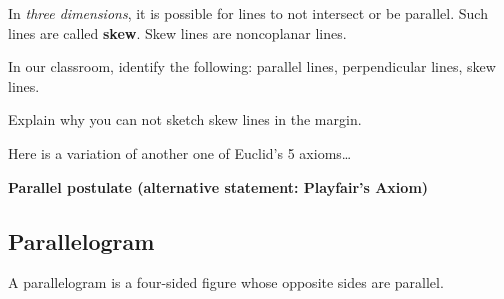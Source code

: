 	\begin{center}	
	\end{center}

In \emph{three dimensions}, it is possible for lines to not intersect or be parallel. 
Such lines are called \textbf{skew}. 
Skew lines are noncoplanar lines.

\q In our classroom, identify the following: parallel lines, perpendicular lines, skew lines.
\medskip

\q Explain why you can not sketch skew lines in the margin.
\smallskip

\noindent Here is a variation of another one of Euclid's 5 axioms\ldots
\begin{tcolorbox}
\textbf{Parallel postulate (alternative statement: Playfair's Axiom)} \\
\begin{center}
\end{center}
\end{tcolorbox}

\subsection{Parallelogram}

A parallelogram is a four-sided figure whose opposite sides are parallel.

